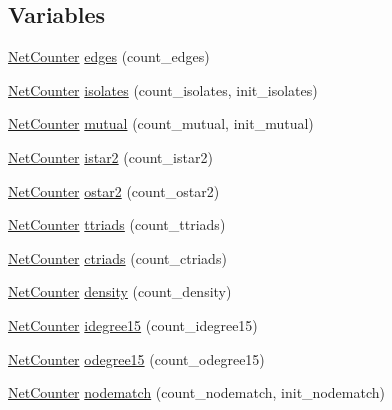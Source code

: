 \subsection*{Variables}
\begin{DoxyCompactItemize}
\item 
\hyperlink{namespacebarray_1_1counters_1_1network_a0246d66b7032c9d44a10d4fd025e1ac5}{Net\+Counter} \hyperlink{namespacebarray_1_1counters_1_1network_a118232d675536b4c77cd34f2d9b468de}{edges} (count\+\_\+edges)
\item 
\hyperlink{namespacebarray_1_1counters_1_1network_a0246d66b7032c9d44a10d4fd025e1ac5}{Net\+Counter} \hyperlink{namespacebarray_1_1counters_1_1network_aa2a917369925871a66a1e6f9c6967146}{isolates} (count\+\_\+isolates, init\+\_\+isolates)
\item 
\hyperlink{namespacebarray_1_1counters_1_1network_a0246d66b7032c9d44a10d4fd025e1ac5}{Net\+Counter} \hyperlink{namespacebarray_1_1counters_1_1network_a0df5d42208075b8788545c4e3880f220}{mutual} (count\+\_\+mutual, init\+\_\+mutual)
\item 
\hyperlink{namespacebarray_1_1counters_1_1network_a0246d66b7032c9d44a10d4fd025e1ac5}{Net\+Counter} \hyperlink{namespacebarray_1_1counters_1_1network_a9397ded8af920f476af3c362dac79f29}{istar2} (count\+\_\+istar2)
\item 
\hyperlink{namespacebarray_1_1counters_1_1network_a0246d66b7032c9d44a10d4fd025e1ac5}{Net\+Counter} \hyperlink{namespacebarray_1_1counters_1_1network_a43e5d9295026bcb8509e87708ad5672f}{ostar2} (count\+\_\+ostar2)
\item 
\hyperlink{namespacebarray_1_1counters_1_1network_a0246d66b7032c9d44a10d4fd025e1ac5}{Net\+Counter} \hyperlink{namespacebarray_1_1counters_1_1network_acfa471203e5630abbba918dbd05cc24b}{ttriads} (count\+\_\+ttriads)
\item 
\hyperlink{namespacebarray_1_1counters_1_1network_a0246d66b7032c9d44a10d4fd025e1ac5}{Net\+Counter} \hyperlink{namespacebarray_1_1counters_1_1network_aaad51f26a778d611135d5622d1f0d5bc}{ctriads} (count\+\_\+ctriads)
\item 
\hyperlink{namespacebarray_1_1counters_1_1network_a0246d66b7032c9d44a10d4fd025e1ac5}{Net\+Counter} \hyperlink{namespacebarray_1_1counters_1_1network_ad98ee6184e0d59ad158265b3c11e5f10}{density} (count\+\_\+density)
\item 
\hyperlink{namespacebarray_1_1counters_1_1network_a0246d66b7032c9d44a10d4fd025e1ac5}{Net\+Counter} \hyperlink{namespacebarray_1_1counters_1_1network_aea699d4246f888aaae8572385953e7c5}{idegree15} (count\+\_\+idegree15)
\item 
\hyperlink{namespacebarray_1_1counters_1_1network_a0246d66b7032c9d44a10d4fd025e1ac5}{Net\+Counter} \hyperlink{namespacebarray_1_1counters_1_1network_abe7460ebbe046a0b23e17915b004e4f9}{odegree15} (count\+\_\+odegree15)
\item 
\hyperlink{namespacebarray_1_1counters_1_1network_a0246d66b7032c9d44a10d4fd025e1ac5}{Net\+Counter} \hyperlink{namespacebarray_1_1counters_1_1network_a38e2d7ed3a903835a78300b49f6bfb6c}{nodematch} (count\+\_\+nodematch, init\+\_\+nodematch)
\end{DoxyCompactItemize}


